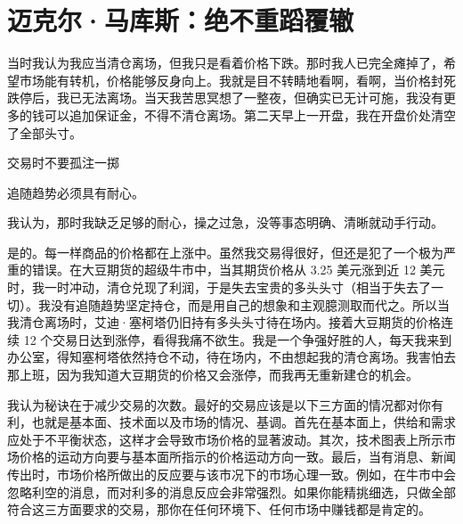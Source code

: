 \chapter{迈克尔·马库斯：绝不重蹈覆辙}
\begin{tcolorbox}[title=在市场价格封死跌停前，还处下跌途中的时候，你考虑过清仓离场吗？]
    当时我认为我应当清仓离场，但我只是看着价格下跌。那时我人已完全瘫掉了，希望市场能有转机，价格能够反身向上。我就是目不转睛地看啊，看啊，当价格封死跌停后，我已无法离场。当天我苦思冥想了一整夜，但确实已无计可施，我没有更多的钱可以追加保证金，不得不清仓离场。第二天早上一开盘，我在开盘价处清空了全部头寸。
\end{tcolorbox}

交易时不要孤注一掷

追随趋势必须具有耐心。

\begin{tcolorbox}[title=那时你仍然在犯什么错呢，你是否还记得？]
    我认为，那时我缺乏足够的耐心，操之过急，没等事态明确、清晰就动手行动。
\end{tcolorbox}

\begin{tcolorbox}[title=在那时要完全做多？]
    是的。每一样商品的价格都在上涨中。虽然我交易得很好，但还是犯了一个极为严重的错误。在大豆期货的超级牛市中，当其期货价格从 3.25 美元涨到近 12 美元时，我一时冲动，清仓兑现了利润，于是失去宝贵的多头头寸（相当于失去了一切）。我没有追随趋势坚定持仓，而是用自己的想象和主观臆测取而代之。所以当我清仓离场时，艾迪·塞柯塔仍旧持有多头头寸待在场内。接着大豆期货的价格连续 12 个交易日达到涨停，看得我痛不欲生。我是一个争强好胜的人，每天我来到办公室，得知塞柯塔依然持仓不动，待在场内，不由想起我的清仓离场。我害怕去那上班，因为我知道大豆期货的价格又会涨停，而我再无重新建仓的机会。
\end{tcolorbox}

\begin{tcolorbox}[title=解决这一问题的方法是什么呢？这里的问题是以前关键点位被突破后就是趋势，但是现在很多假突破。]
    我认为秘诀在于减少交易的次数。最好的交易应该是以下三方面的情况都对你有利，也就是基本面、技术面以及市场的情况、基调。首先在基本面上，供给和需求应处于不平衡状态，这样才会导致市场价格的显著波动。其次，技术图表上所示市场价格的运动方向要与基本面所指示的价格运动方向一致。最后，当有消息、新闻传出时，市场价格所做出的反应要与该市况下的市场心理一致。例如，在牛市中会忽略利空的消息，而对利多的消息反应会非常强烈。如果你能精挑细选，只做全部符合这三方面要求的交易，那你在任何环境下、任何市场中赚钱都是肯定的。
\end{tcolorbox}

